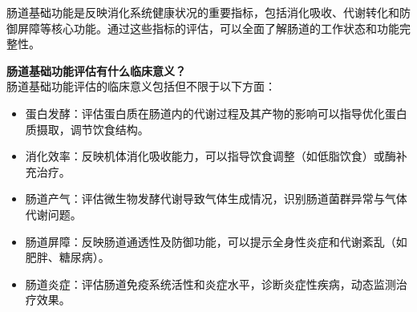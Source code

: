\documentclass[UTF8]{ctexart}
\begin{document}
\vspace{-1.0cm}

\begin{tcolorbox}[
    enhanced,
    colback=customTealBg,
    colframe=gray!3,
    arc=3mm,
    boxrule=0pt,
    width=\textwidth,
    top=8pt,
    bottom=8pt
]
{\normalsize{\color{customTeal}\faInfoCircle} 肠道基础功能是反映消化系统健康状况的重要指标，包括消化吸收、代谢转化和防御屏障等核心功能。通过这些指标的评估，可以全面了解肠道的工作状态和功能完整性。
}
\end{tcolorbox}

\begin{tcolorbox}[
    enhanced,
    colback=lightpurple!10, %
    colframe=white,  %
    arc=3mm,
    boxrule=0.5pt,
    width=\textwidth,
    top=8pt,
    bottom=8pt
]
{\normalsize{\color{lightpurple}\faQuestionCircle}\quad \textbf{肠道基础功能评估有什么临床意义？}\\
{\color{orange!50}\faComments}\quad 肠道基础功能评估的临床意义包括但不限于以下方面：
\begin{itemize}
    \item 蛋白发酵：评估蛋白质在肠道内的代谢过程及其产物的影响可以指导优化蛋白质摄取，调节饮食结构。
    \item 消化效率：反映机体消化吸收能力，可以指导饮食调整（如低脂饮食）或酶补充治疗。
    \item 肠道产气：评估微生物发酵代谢导致气体生成情况，识别肠道菌群异常与气体代谢问题。
    \item 肠道屏障：反映肠道通透性及防御功能，可以提示全身性炎症和代谢紊乱（如肥胖、糖尿病）。
    \item 肠道炎症：评估肠道免疫系统活性和炎症水平，诊断炎症性疾病，动态监测治疗效果。
\end{itemize}
}
\end{tcolorbox}
\vspace{-0.7cm}
\end{document}
